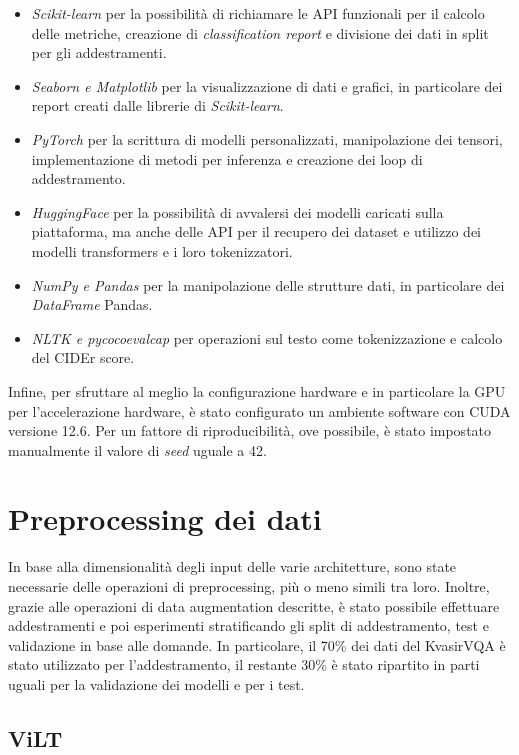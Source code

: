 \documentclass[../main.tex]{subfiles}
\begin{document}
\begin{itemize}
    \item \textit{Scikit-learn} per la possibilità di richiamare le API funzionali per il calcolo delle metriche, creazione di \textit{classification report} e divisione dei dati in split per gli addestramenti.
    \item \textit{Seaborn e Matplotlib} per la visualizzazione di dati e grafici, in particolare dei report creati dalle librerie di \textit{Scikit-learn}.
    \item \textit{PyTorch} per la scrittura di modelli personalizzati, manipolazione dei tensori, implementazione di metodi per inferenza e creazione dei loop di addestramento.
    \item \textit{HuggingFace} per la possibilità di avvalersi dei modelli caricati sulla piattaforma, ma anche delle API per il recupero dei dataset e utilizzo dei modelli transformers e i loro tokenizzatori.
    \item \textit{NumPy e Pandas} per la manipolazione delle strutture dati, in particolare dei \textit{DataFrame} Pandas.
    \item \textit{NLTK e pycocoevalcap} per operazioni sul testo come tokenizzazione e calcolo del CIDEr score.
\end{itemize} 

Infine, per sfruttare al meglio la configurazione hardware e in particolare la GPU per l'accelerazione hardware, è stato configurato un ambiente software con CUDA versione 12.6.
Per un fattore di riproducibilità, ove possibile, è stato impostato manualmente il valore di \textit{seed} uguale a 42.

\section{Preprocessing dei dati}

In base alla dimensionalità degli input delle varie architetture, sono state necessarie delle operazioni di preprocessing, più o meno simili tra loro.
Inoltre, grazie alle operazioni di data augmentation descritte, è stato possibile effettuare addestramenti e poi esperimenti stratificando gli split di addestramento, test e validazione in base alle domande. 
In particolare, il 70\% dei dati del KvasirVQA è stato utilizzato per l'addestramento, il restante 30\% è stato ripartito in parti uguali per la validazione dei modelli e per i test.

\subsection{ViLT}
\end{document}
